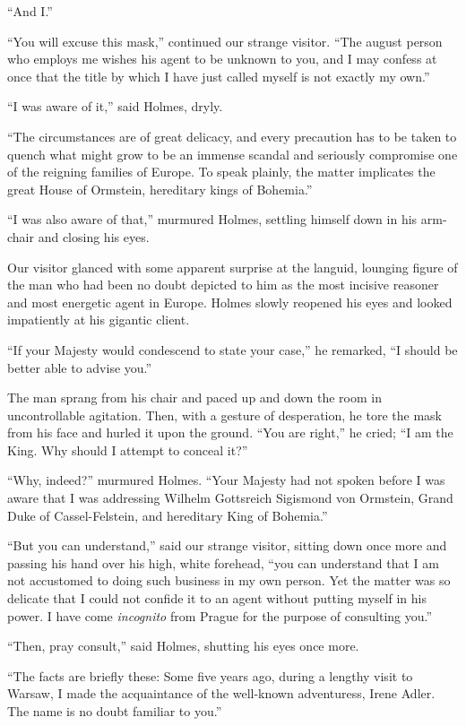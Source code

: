 “And I.”

“You will excuse this mask,” continued our strange visitor.
“The august person who employs me wishes his agent to be
unknown to you, and I may confess at once that the title by
which I have just called myself is not exactly my own.”

“I was aware of it,” said Holmes, dryly.

“The circumstances are of great delicacy, and every precaution
has to be taken to quench what might grow to be
an immense scandal and seriously compromise one of the
reigning families of Europe. To speak plainly, the matter
implicates the great House of Ormstein, hereditary kings of
Bohemia.”

“I was also aware of that,” murmured Holmes, settling
himself down in his arm-chair and closing his eyes.

Our visitor glanced with some apparent surprise at the
languid, lounging figure of the man who had been no doubt
depicted to him as the most incisive reasoner and most energetic
agent in Europe. Holmes slowly reopened his eyes and
looked impatiently at his gigantic client.

“If your Majesty would condescend to state your case,” he
remarked, “I should be better able to advise you.”

The man sprang from his chair and paced up and down
the room in uncontrollable agitation. Then, with a gesture of
desperation, he tore the mask from his face and hurled it
upon the ground. “You are right,” he cried; “I am the
King. Why should I attempt to conceal it?”

“Why, indeed?” murmured Holmes. “Your Maj\-esty had
not spoken before I was aware that I was addressing Wilhelm
Gottsreich Sigismond von Ormstein, Grand Duke of Cassel-Felstein,
and hereditary King of Bohemia.”

“But you can understand,” said our strange visitor, sitting
down once more and passing his hand over his high, white
forehead, “you can understand that I am not accustomed to
doing such business in my own person. Yet the matter was
so delicate that I could not confide it to an agent without
putting myself in his power. I have come \textit{incognito} from
Prague for the purpose of consulting you.”

“Then, pray consult,” said Holmes, shutting his eyes once
more.

“The facts are briefly these: Some five years ago, during
a lengthy visit to Warsaw, I made the acquaintance of the
well-known adventuress, Irene Adler. The name is no doubt
familiar to you.”

